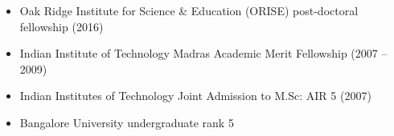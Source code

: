 \begin{itemize}
    \item Oak Ridge Institute for Science \& Education (ORISE) post-doctoral fellowship (2016)
    \item Indian Institute of Technology Madras Academic Merit Fellowship (2007 -- 2009)
    \item Indian Institutes of Technology Joint Admission to M.Sc: AIR 5 (2007)
    \item Bangalore University undergraduate rank 5 
\end{itemize}